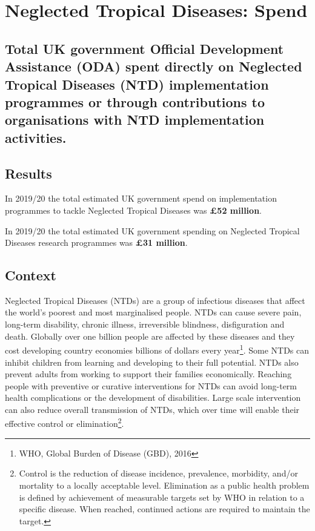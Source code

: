 \chapter{Neglected Tropical Diseases: Spend}

\section*{Total UK government Official Development Assistance (ODA) spent directly on Neglected Tropical Diseases (NTD) implementation programmes or through contributions to organisations with NTD implementation activities.} %

\thispagestyle{empty}

\section{Results}

In 2019/20 the total estimated UK government spend on implementation programmes to tackle Neglected Tropical Diseases was \textbf{\pounds 52 million}. %

In 2019/20 the total estimated UK government spending on Neglected Tropical Diseases research programmes was \textbf{\pounds 31 million}. %


\section{Context}

Neglected Tropical Diseases (NTDs) are a group of infectious diseases that affect the world's poorest and most marginalised people. %
NTDs can cause severe pain, long-term disability, chronic illness, irreversible blindness, disfiguration and death. %
Globally over one billion people are affected by these diseases and they cost developing country economies billions of dollars every year\footnote{WHO, Global Burden of Disease (GBD), 2016}. %
Some NTDs can inhibit children from learning and developing to their full potential. %
NTDs also prevent adults from working to support their families economically. %
Reaching people with preventive or curative interventions for NTDs can avoid long-term health complications or the development of disabilities. %
Large scale intervention can also reduce overall transmission of NTDs, which over time will enable their effective control or elimination\footnote{Control is the reduction of disease incidence, prevalence, morbidity, and/or mortality to a locally acceptable level. Elimination as a public health problem is defined by achievement of measurable targets set by WHO in relation to a specific disease. When reached, continued actions are required to maintain the target.}.

